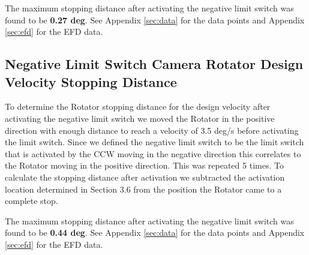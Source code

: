 \documentclass[SE,lsstdraft,authoryear,toc]{lsstdoc}
\begin{document}
The maximum stopping distance after activating the negative limit switch
was found to be \textbf{0.27 deg}. See Appendix \ref{sec:data} for the data points
and Appendix \ref{sec:efd} for the EFD data.

\subsection{Negative Limit Switch Camera Rotator Design Velocity Stopping Distance}

To determine the Rotator stopping distance for the design velocity after
activating the negative limit switch we moved the Rotator in the
positive direction with enough distance to reach a velocity of 3.5 deg/s
before activating the limit switch. Since we defined the negative limit
switch to be the limit switch that is activated by the CCW moving in the
negative direction this correlates to the Rotator moving in the positive
direction. This was repeated 5 times. To calculate the stopping
distance after activation we subtracted the activation location
determined in Section 3.6 from the position the Rotator came to a
complete stop.

The maximum stopping distance after activating the negative limit switch
was found to be \textbf{0.44 deg}. See Appendix \ref{sec:data} for the data points
and Appendix \ref{sec:efd} for the EFD data.
\end{document}
